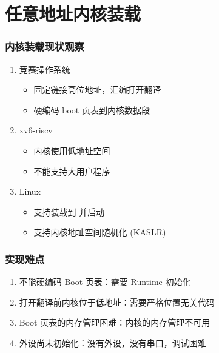 \section{任意地址内核装载}


\begin{frame}
    \frametitle{内核装载现状观察}

    \begin{enumerate}
        \item 竞赛操作系统
              \begin{itemize}
                  \item 固定链接高位地址，汇编打开翻译
                  \item 硬编码 boot 页表到内核数据段
              \end{itemize}
        \item xv6-riscv
              \begin{itemize}
                  \item 内核使用低地址空间
                  \item 不能支持大用户程序
              \end{itemize}
        \item Linux
              \begin{itemize}
                  \item 支持装载到  并启动
                  \item 支持内核地址空间随机化 (KASLR)
              \end{itemize}
    \end{enumerate}

\end{frame}

\begin{frame}
    \frametitle{实现难点}

    \begin{enumerate}
        \item 不能硬编码 Boot 页表：需要 Runtime 初始化
        \item 打开翻译前内核位于低地址：需要严格位置无关代码
        \item Boot 页表的内存管理困难：内核的内存管理不可用
        \item 外设尚未初始化：没有外设，没有串口，调试困难
    \end{enumerate}

\end{frame}

